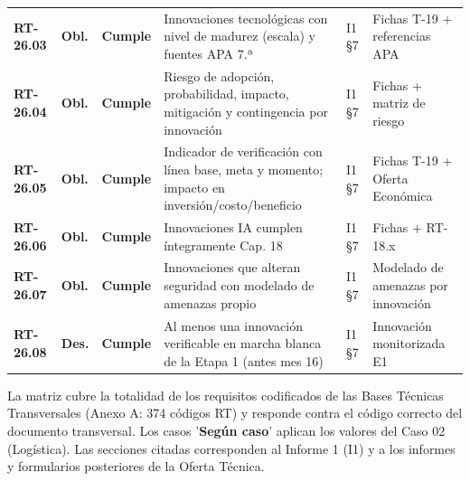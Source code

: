 \begin{small}
\begin{longtable}{@{}p{1.35cm} p{1.15cm} p{1.15cm} p{4.6cm} p{2.35cm} p{3.8cm}@{}}
\textbf{RT-26.03} & \textbf{Obl.} & \textbf{Cumple} & Innovaciones tecnol\'ogicas con nivel de madurez (escala) y fuentes APA 7.ª & I1 §7 & Fichas T-19 + referencias APA \\
\textbf{RT-26.04} & \textbf{Obl.} & \textbf{Cumple} & Riesgo de adopci\'on, probabilidad, impacto, mitigaci\'on y contingencia por innovaci\'on & I1 §7 & Fichas + matriz de riesgo \\
\textbf{RT-26.05} & \textbf{Obl.} & \textbf{Cumple} & Indicador de verificaci\'on con l\'inea base, meta y momento; impacto en inversi\'on/costo/beneficio & I1 §7 & Fichas T-19 + Oferta Econ\'omica \\
\textbf{RT-26.06} & \textbf{Obl.} & \textbf{Cumple} & Innovaciones IA cumplen \'integramente Cap. 18 & I1 §7 & Fichas + RT-18.x \\
\textbf{RT-26.07} & \textbf{Obl.} & \textbf{Cumple} & Innovaciones que alteran seguridad con modelado de amenazas propio & I1 §7 & Modelado de amenazas por innovaci\'on \\
\textbf{RT-26.08} & \textbf{Des.} & \textbf{Cumple} & Al menos una innovaci\'on verificable en marcha blanca de la Etapa 1 (antes mes 16) & I1 §7 & Innovaci\'on monitorizada E1 \\
\end{longtable}
\end{small}

\vspace{2pt}
{\small\color{lafroxGrato}La matriz cubre la totalidad de los requisitos codificados de las Bases Técnicas Transversales (Anexo A: 374 códigos RT) y responde contra el código correcto del documento transversal. Los casos '\textbf{Según caso}' aplican los valores del Caso 02 (Logística). Las secciones citadas corresponden al Informe 1 (I1) y a los informes y formularios posteriores de la Oferta Técnica.}

